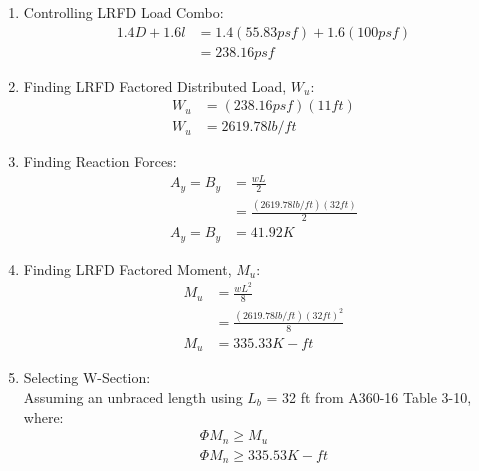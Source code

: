 \documentclass{report} %
\begin{document}
\begin{enumerate}
    \item Controlling LRFD Load Combo:
        \begin{equation*}
            \begin{aligned}
                1.4D + 1.6l &= 1.4(55.83psf) + 1.6(100psf) \\
                            &= 238.16psf 
            \end{aligned}
        \end{equation*}
        \item Finding LRFD Factored Distributed Load, $W_u$:
        \begin{equation*}
            \begin{aligned}
                W_u &= (238.16psf)(11ft) \\
                W_u &= 2619.78 lb/ft 
            \end{aligned}
        \end{equation*}
    \item Finding Reaction Forces:
        \begin{equation*}
            \begin{aligned}
                A_y = B_y &= \frac{wL}{2} \\
                        &= \frac{(2619.78 lb/ft)(32 ft)}{2} \\
                A_y = B_y &= 41.92K
            \end{aligned}
        \end{equation*}
    \item Finding LRFD Factored Moment, $M_u$:
        \begin{equation*}
            \begin{aligned}
                M_u &= \frac{wL^2}{8} \\
                    &= \frac{(2619.78 lb/ft)(32 ft)^2}{8} \\
                M_u &= 335.33 K-ft
            \end{aligned}
        \end{equation*}
    \item Selecting W-Section:\\
    Assuming an unbraced length using $L_b$ = 32 ft from A360-16 Table 3-10, where:
        \begin{equation*}
            \begin{aligned}
                \Phi M_n \geq M_u \\
                \Phi M_n \geq 335.53 K-ft
            \end{aligned}
        \end{equation*}
\end{enumerate}
\begin{center}
\end{center}
\end{document}
